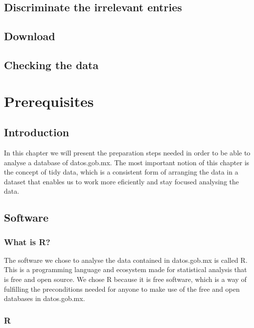 \documentclass[]{book}
\begin{document}
\section{Discriminate the irrelevant
entries}\label{discriminate-the-irrelevant-entries}

\section{Download}\label{download}

\section{Checking the data}\label{checking-the-data}

\chapter{Prerequisites}\label{prerequisites}

\section{Introduction}\label{introduction-2}

In this chapter we will present the preparation steps needed in order to
be able to analyse a database of datos.gob.mx. The most important notion
of this chapter is the concept of tidy data, which is a consistent form
of arranging the data in a dataset that enables us to work more
eficiently and stay focused analysing the data.

\section{Software}\label{software}

\subsection{What is R?}\label{what-is-r}

The software we chose to analyse the data contained in datos.gob.mx is
called R. This is a programming language and ecosystem made for
statistical analysis that is free and open source. We chose R because it
is free software, which is a way of fulfilling the preconditions needed
for anyone to make use of the free and open databases in datos.gob.mx.

\subsection{R}\label{r}
\end{document}
